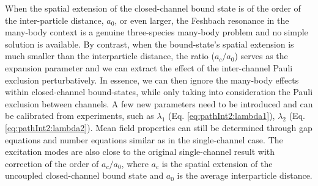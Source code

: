 \documentclass[reprint,pra]{revtex4-1}
\begin{document}
When the spatial extension of  the closed-channel bound state is  of the order of the   inter-particle distance, $a_{0}$, or even larger, the Feshbach resonance in the many-body context is a genuine three-species many-body problem and no simple solution is available.  By contrast, when the bound-state's spatial extension is much smaller than the interparticle distance, the ratio ($a_{c}/a_{0}$) serves as the expansion parameter and we can extract  the effect of the inter-channel Pauli exclusion perturbatively.  In essence, we can then  ignore the many-body effects within  closed-channel bound-states, while only taking into consideration  the Pauli exclusion between channels.  A few new parameters need to be introduced and can be calibrated from experiments, such as $\lambda_{1}$ (Eq. \ref{eq:pathInt2:lambda1}), $\lambda_{2}$ (Eq. \ref{eq:pathInt2:lambda2}).  Mean field properties can still be determined through gap equations and number equations similar as in the single-channel case.  The excitation modes are also close to the original single-channel result with correction of the order of $a_{c}/a_{0}$, where $a_{c}$ is the spatial extension of the uncoupled closed-channel  bound state and $a_{0}$ is the average interparticle distance.
\end{document}

